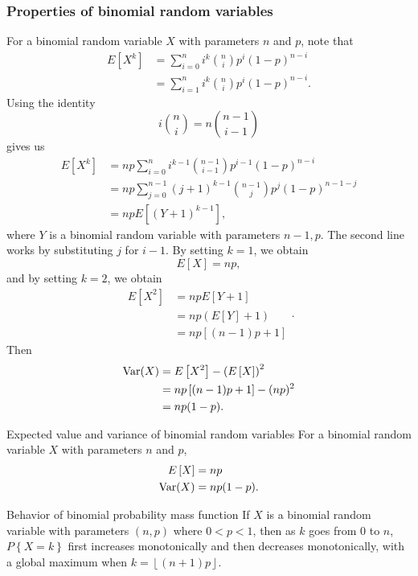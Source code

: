\subsubsection{Properties of binomial random variables}
For a binomial random variable $X$ with parameters $n$ and $p$, note that \[
    \begin{aligned}
        E\left[ X^k \right] &= \sum^n_{i = 0} i^k \binom{n}{i}p^i(1 - p)^{n - i} \\
        &= \sum^n_{i = 1} i^k \binom{n}{i}p^i(1 - p)^{n - i}.
    \end{aligned} 
\] Using the identity \[
    i\binom{n}{i} = n\binom{n-1}{i-1}    
\] gives us \[
    \begin{aligned}
        E\left[ X^k \right] &= np \sum^n_{i = 0} i^{k - 1}\binom{n - 1}{i - 1}p^{i - 1}(1 - p)^{n - i} \\
        &= np \sum^{n - 1}_{j = 0} (j + 1)^{k - 1}\binom{n - 1}{j}p^j(1 - p)^{n - 1 - j} \\
        &= npE\left[ (Y + 1)^{k - 1} \right],
    \end{aligned}    
\] where $Y$ is a binomial random variable with parameters $n - 1, p$. The second line works by substituting $j$ for $i - 1$. By setting $k = 1$, we obtain \[
    E\left[ X \right] = np,    
\] and by setting $k = 2$, we obtain \[
    \begin{aligned}
        E\left[ X^2 \right] &= npE\left[ Y + 1 \right] \\
        &= np\left( E\left[ Y \right] + 1 \right) \\
        &= np\left[ (n-1)p + 1 \right]
    \end{aligned}.
\] Then \[
    \begin{aligned}
        \operatorname{Var}(X) &= E\left[ X^2 \right] - \left( E\left[ X \right] \right)^2 \\
        &= np\left[ (n-1)p + 1 \right] - (np)^2 \\
        &= np(1 - p).
    \end{aligned}    
\]
\begin{bdef}{Expected value and variance of binomial random variables}\label{expectedvaluebinomial}
    For a binomial random variable $X$ with parameters $n$ and $p$, \[
        \begin{aligned}
            E\left[ X \right] &= np \\
            \operatorname{Var}(X) &= np(1 - p).
        \end{aligned}
    \]
\end{bdef}
\begin{proposition}{Behavior of binomial probability mass function}
    If $X$ is a binomial random variable with parameters $(n, p)$ where $0 < p < 1$, then as $k$ goes from $0$ to $n$, $P\left\{ X = k \right\}$ first increases monotonically and then decreases monotonically, with a global maximum when $k = \left\lfloor (n + 1)p \right\rfloor$.
\end{proposition}

